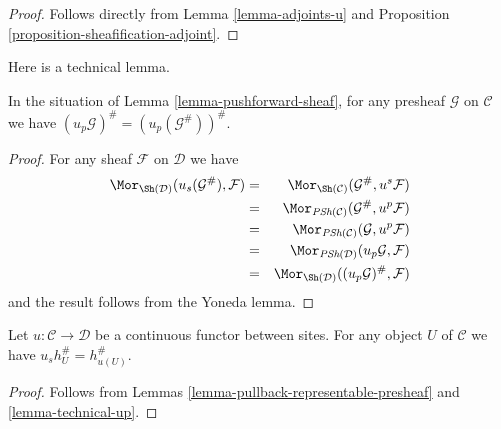 \begin{proof}
Follows directly from Lemma \ref{lemma-adjoints-u} and
Proposition \ref{proposition-sheafification-adjoint}.
\end{proof}

\noindent
Here is a technical lemma.

\begin{lemma}
\label{lemma-technical-up}
In the situation of Lemma \ref{lemma-pushforward-sheaf}, for any presheaf $\mathcal{G}$ on $\mathcal{C}$
we have $(u_p\mathcal{G})^\# = (u_p(\mathcal{G}^\#))^\#$.
\end{lemma}

\begin{proof}
For any sheaf $\mathcal{F}$ on $\mathcal{D}$ we have
\begin{eqnarray*}
\Mor_{\Sh(\mathcal{D})}(u_s(\mathcal{G}^\#), \mathcal{F})
& = &
\Mor_{\Sh(\mathcal{C})}(\mathcal{G}^\#, u^s\mathcal{F}) \\
& = &
\Mor_{\textit{PSh}(\mathcal{C})}(\mathcal{G}^\#, u^p\mathcal{F}) \\
& = &
\Mor_{\textit{PSh}(\mathcal{C})}(\mathcal{G}, u^p\mathcal{F}) \\
& = &
\Mor_{\textit{PSh}(\mathcal{D})}(u_p\mathcal{G}, \mathcal{F}) \\
& = &
\Mor_{\Sh(\mathcal{D})}((u_p\mathcal{G})^\#, \mathcal{F})
\end{eqnarray*}
and the result follows from the Yoneda lemma.
\end{proof}

\begin{lemma}
\label{lemma-pullback-representable-sheaf}
Let $u : \mathcal{C} \to \mathcal{D}$ be a continuous functor
between sites.
For any object $U$ of $\mathcal{C}$ we have $u_sh_U^\# = h_{u(U)}^\#$.
\end{lemma}

\begin{proof}
Follows from
Lemmas \ref{lemma-pullback-representable-presheaf}
and \ref{lemma-technical-up}.
\end{proof}


